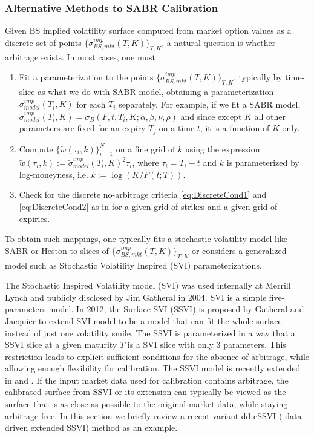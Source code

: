 \documentclass[letterpaper,12pt,titlepage,oneside,final]{book}
\numberwithin{equation}{section}
\theoremstyle{definition}
\begin{document}
 \subsubsection{Alternative Methods to SABR Calibration}
 Given BS implied volatility surface computed from market option values as a discrete set of points $\{ \sigma^{imp}_{BS,mkt}(T,K) \}_{T,K}$, a natural question is whether  arbitrage exists. In most cases, one must 
 \begin{enumerate}
 \item Fit a parameterization to the points $\{ \sigma^{imp}_{BS,mkt}(T,K) \}_{T,K}$, typically by time-slice as what we do with SABR model, obtaining a parameterization $\widetilde{\sigma}^{imp}_{model}(T_i,K)$ for each $T_i$ separately.
 For example, if we fit a SABR model, $\widetilde{\sigma}^{imp}_{model}(T_i,K)=\sigma_{B}(F,t,T_i,K;\alpha,\beta,\nu,\rho)$ and since except $K$ all other parameters are fixed for an expiry $T_j$ on a time $t$, it is a function of $K$ only.
 \item Compute $\{ \widetilde{w}(\tau_i,k) \}_{i=1}^N$ on a fine grid of $k$ using the expression $\widetilde{w}(\tau_i,k) := \widetilde{\sigma}^{imp}_{model}(T_i,K)^2 \tau_i$,  where $\tau_i =T_i-t$ and $k$ is parameterized by log-moneyness, i.e. $k := \log(K/F(t;T))$.  
 \item Check for the discrete no-arbitrage criteria \eqref{eq:DiscreteCond1} and \eqref{eq:DiscreteCond2} as in \cite{carr2005note} for a given grid of strikes and a given grid of expiries. 
 \end{enumerate}
 To obtain such mappings, one typically fits a stochastic volatility model like SABR or Heston to slices of $\{\sigma^{imp}_{BS,mkt}(T,K)\}_{T,K}$ or considers a generalized model such as Stochastic Volatility Inspired (SVI) parameterizations.  
 
 The Stochastic Inspired Volatility model (SVI) \cite{gatheral2004parsimonious} was used internally at Merrill Lynch and publicly disclosed by Jim Gatheral in 2004.  SVI is a simple  five-parameters model.  In 2012,  the Surface SVI (SSVI) \cite{gatheral2014arbitrage} is proposed by Gatheral and Jacquier to extend SVI model to be a model that can fit the whole surface instead of just one volatility smile. The SSVI is parameterized in a way that a  SSVI slice at a given maturity $T$ is a SVI slice with only 3 parameters. This restriction leads to  explicit sufficient conditions for the absence of arbitrage, while allowing enough flexibility for calibration. The SSVI model is recently extended in \cite{hendriks2017extended} and \cite{corbetta2019robust}. If the input market data used for calibration contains arbitrage, the calibrated surface from SSVI \cite{gatheral2014arbitrage} or its extension \cite{hendriks2017extended,corbetta2019robust} can typically be viewed as the surface that is as close as possible to the original market data, while staying arbitrage-free. In this section we briefly review a recent variant dd-eSSVI ( data-driven extended SSVI) method \cite{corbetta2019robust} as an example.
 
\end{document}
